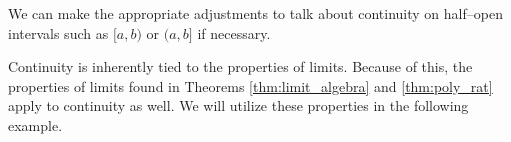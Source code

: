 We can make the appropriate adjustments to talk about continuity on half--open intervals such as $[a,b)$ or $(a,b]$ if necessary.\bigskip
%
%

Continuity is inherently tied to the properties of limits. Because of this, the properties of limits found in Theorems \ref{thm:limit_algebra} and \ref{thm:poly_rat}
apply to continuity as well. We will utilize these properties in the following example.

